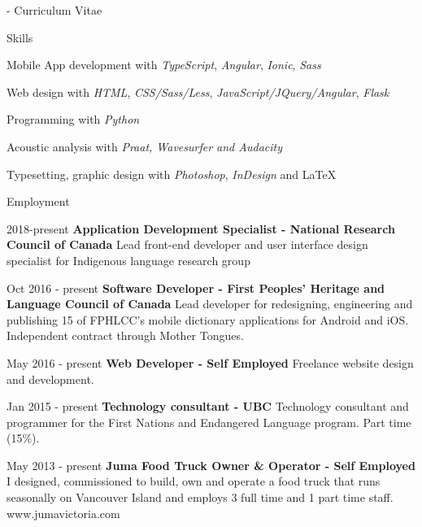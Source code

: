 \documentclass[12pt]{letter}
\begin{document}
\begin{cv}{     \space - \space   Curriculum Vitae}
         \begin{cvlist}{Skills}
             \item Mobile App development with \textit{TypeScript}, \textit{Angular}, \textit{Ionic}, \textit{Sass} 
             \item Web design with \textit{HTML}, \textit{CSS/Sass/Less}, \textit{JavaScript/JQuery/Angular}, \textit{Flask}
             \item Programming with \textit{Python}
             \item Acoustic analysis with \textit{Praat, Wavesurfer and Audacity}
            \item Typesetting, graphic design with \textit{Photoshop}, \textit{InDesign} and \LaTeX
         \end{cvlist}
        \begin{cvlist}{Employment}
            \item[2018-present] \textbf{Application Development Specialist - National Research Council of Canada}
            \newline Lead front-end developer and user interface design specialist for Indigenous language research group
            \item[Oct 2016 - present] \textbf{Software Developer - First Peoples' Heritage and Language Council of Canada}
            \newline Lead developer for redesigning, engineering and publishing 15 of FPHLCC's mobile dictionary applications for Android and iOS. Independent contract through Mother Tongues.
            
            \item[May 2016 - present] \textbf{Web Developer - Self Employed}
            \newline Freelance website design and development.
            
            \item[Jan 2015 - present] \textbf{Technology consultant - UBC}
            \newline Technology consultant and programmer for the First Nations and Endangered Language program. Part time (15\%).
            
                    \item[May 2013 - present] \textbf{Juma Food Truck Owner \& Operator - Self Employed}
            \newline I designed, commissioned to build, own and operate a food truck that runs seasonally on Vancouver Island and employs 3 full time and 1 part time staff. www.jumavictoria.com
            

\end{cvlist}
\end{cv}
\end{document}
